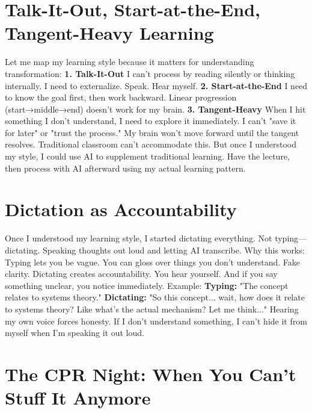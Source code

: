 \section{Talk-It-Out, Start-at-the-End, Tangent-Heavy Learning}

Let me map my learning style because it matters for understanding transformation:
\textbf{1. Talk-It-Out}
I can't process by reading silently or thinking internally. I need to externalize. Speak. Hear myself.
\textbf{2. Start-at-the-End}
I need to know the goal first, then work backward. Linear progression (start→middle→end) doesn't work for my brain.
\textbf{3. Tangent-Heavy}
When I hit something I don't understand, I need to explore it immediately. I can't "save it for later" or "trust the process." My brain won't move forward until the tangent resolves.
Traditional classroom can't accommodate this.
But once I understood my style, I could use AI to supplement traditional learning. Have the lecture, then process with AI afterward using my actual learning pattern.

\section{Dictation as Accountability}

Once I understood my learning style, I started dictating everything.
Not typing—dictating. Speaking thoughts out loud and letting AI transcribe.
Why this works:
Typing lets you be vague. You can gloss over things you don't understand. Fake clarity.
Dictating creates accountability. You hear yourself. And if you say something unclear, you notice immediately.
Example:
\textbf{Typing:} "The concept relates to systems theory."
\textbf{Dictating:} "So this concept... wait, how does it relate to systems theory? Like what's the actual mechanism? Let me think..."
Hearing my own voice forces honesty.
If I don't understand something, I can't hide it from myself when I'm speaking it out loud.

\section{The CPR Night: When You Can't Stuff It Anymore}

